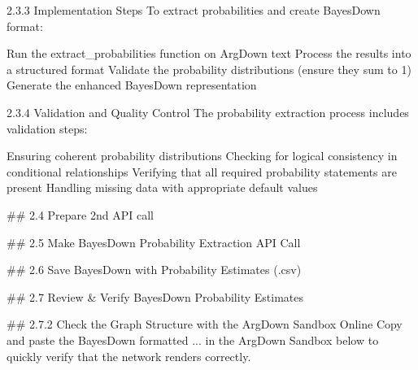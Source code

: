 \documentclass[
  11pt,
  letterpaper,
]{book}
\newenvironment{Shaded}{\begin{snugshade}}{\end{snugshade}}
\newcommand{\ErrorTok}[1]{\textcolor[rgb]{0.68,0.00,0.00}{#1}}
\begin{document}
\begin{Shaded}
\begin{Highlighting}[]
\ErrorTok{2.3.3} \ErrorTok{Implementation} \ErrorTok{Steps}
\ErrorTok{To} \ErrorTok{extract} \ErrorTok{probabilities} \ErrorTok{and} \ErrorTok{create} \ErrorTok{BayesDown} \ErrorTok{format:}

\ErrorTok{Run} \ErrorTok{the} \ErrorTok{extract\_probabilities} \ErrorTok{function} \ErrorTok{on} \ErrorTok{ArgDown} \ErrorTok{text}
\ErrorTok{Process} \ErrorTok{the} \ErrorTok{results} \ErrorTok{into} \ErrorTok{a} \ErrorTok{structured} \ErrorTok{format}
\ErrorTok{Validate} \ErrorTok{the} \ErrorTok{probability} \ErrorTok{distributions} \ErrorTok{(ensure} \ErrorTok{they} \ErrorTok{sum} \ErrorTok{to} \ErrorTok{1)}
\ErrorTok{Generate} \ErrorTok{the} \ErrorTok{enhanced} \ErrorTok{BayesDown} \ErrorTok{representation}

\ErrorTok{2.3.4} \ErrorTok{Validation} \ErrorTok{and} \ErrorTok{Quality} \ErrorTok{Control}
\ErrorTok{The} \ErrorTok{probability} \ErrorTok{extraction} \ErrorTok{process} \ErrorTok{includes} \ErrorTok{validation} \ErrorTok{steps:}

\ErrorTok{Ensuring} \ErrorTok{coherent} \ErrorTok{probability} \ErrorTok{distributions}
\ErrorTok{Checking} \ErrorTok{for} \ErrorTok{logical} \ErrorTok{consistency} \ErrorTok{in} \ErrorTok{conditional} \ErrorTok{relationships}
\ErrorTok{Verifying} \ErrorTok{that} \ErrorTok{all} \ErrorTok{required} \ErrorTok{probability} \ErrorTok{statements} \ErrorTok{are} \ErrorTok{present}
\ErrorTok{Handling} \ErrorTok{missing} \ErrorTok{data} \ErrorTok{with} \ErrorTok{appropriate} \ErrorTok{default} \ErrorTok{values}

\ErrorTok{\#\#} \ErrorTok{2.4} \ErrorTok{Prepare} \ErrorTok{2nd} \ErrorTok{API} \ErrorTok{call}

\ErrorTok{\#\#} \ErrorTok{2.5} \ErrorTok{Make} \ErrorTok{BayesDown} \ErrorTok{Probability} \ErrorTok{Extraction} \ErrorTok{API} \ErrorTok{Call}

\ErrorTok{\#\#} \ErrorTok{2.6} \ErrorTok{Save} \ErrorTok{BayesDown} \ErrorTok{with} \ErrorTok{Probability} \ErrorTok{Estimates} \ErrorTok{(.csv)}

\ErrorTok{\#\#} \ErrorTok{2.7} \ErrorTok{Review} \ErrorTok{\&} \ErrorTok{Verify} \ErrorTok{BayesDown} \ErrorTok{Probability} \ErrorTok{Estimates}

\ErrorTok{\#\#} \ErrorTok{2.7.2} \ErrorTok{Check} \ErrorTok{the} \ErrorTok{Graph} \ErrorTok{Structure} \ErrorTok{with} \ErrorTok{the} \ErrorTok{ArgDown} \ErrorTok{Sandbox} \ErrorTok{Online}
\ErrorTok{Copy} \ErrorTok{and} \ErrorTok{paste} \ErrorTok{the} \ErrorTok{BayesDown} \ErrorTok{formatted} \ErrorTok{...} \ErrorTok{in} \ErrorTok{the} \ErrorTok{ArgDown} \ErrorTok{Sandbox} \ErrorTok{below} \ErrorTok{to} \ErrorTok{quickly} \ErrorTok{verify} \ErrorTok{that} \ErrorTok{the} \ErrorTok{network} \ErrorTok{renders} \ErrorTok{correctly.}


\end{Highlighting}
\end{Shaded}
\end{document}
